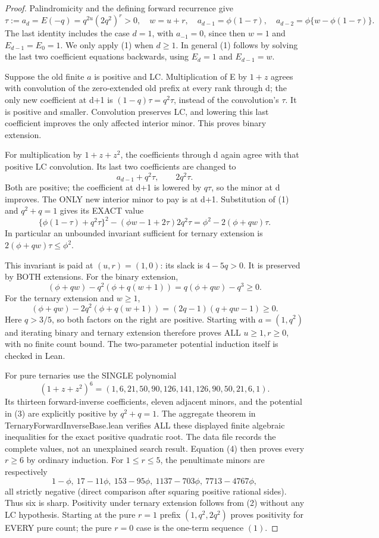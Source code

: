 \begin{proof}
Palindromicity and the defining forward recurrence give
\[
 \tau:=a_d=E(-q)=q^{2u}(2q^2)^r>0,\quad w=u+r,
 \quad a_{d-1}=\phi(1-\tau),\quad
 a_{d-2}=\phi\{w-\phi(1-\tau)\}.                 \tag{1}
\]
The last identity includes the case $d=1$, with $a_{-1}=0$,
since then $w=1$ and $E_{d-1}=E_0=1$. We only apply (1) when
$d\ge1$. In general (1) follows by solving the last two coefficient
equations backwards, using $E_d=1$ and $E_{d-1}=w$.

Suppose the old finite $a$ is positive and LC. Multiplication of E
by $1+z$ agrees with convolution of the zero-extended old prefix
at every rank through d; the only new coefficient at d+1 is
$(1-q)\tau=q^2\tau$, instead of the convolution's $\tau$.
It is positive and smaller. Convolution preserves LC, and lowering
this last coefficient improves the only affected interior minor.
This proves binary extension.

For multiplication by $1+z+z^2$, the coefficients through d again
agree with that positive LC convolution. Its last two coefficients
are changed to
\[
       a_{d-1}+q^2\tau,\qquad 2q^2\tau.           \tag{2}
\]
Both are positive; the coefficient at d+1 is lowered by $q\tau$,
so the minor at d improves. The ONLY new interior minor to pay is
at d+1. Substitution of (1) and $q^2+q=1$ gives its EXACT value
\[
 \{\phi(1-\tau)+q^2\tau\}^2
 -(\phi w-1+2\tau)2q^2\tau
       =\phi^2-2(\phi+qw)\tau.                    \tag{3}
\]
In particular an unbounded invariant sufficient for ternary extension
is $2(\phi+qw)\tau\le\phi^2$.

This invariant is paid at $(u,r)=(1,0)$: its slack is $4-5q>0$.
It is preserved by BOTH extensions. For the binary extension,
\[
 (\phi+qw)-q^2(\phi+q(w+1))=q(\phi+qw)-q^3\ge0.
\]
For the ternary extension and $w\ge1$,
\[
 (\phi+qw)-2q^2(\phi+q(w+1))
             =(2q-1)(q+qw-1)\ge0.                 \tag{4}
\]
Here $q>3/5$, so both factors on the right are positive.
Starting with $a=(1,q^2)$ and iterating binary and ternary extension
therefore proves ALL $u\ge1,r\ge0$, with no finite count bound.
The two-parameter potential induction itself is checked in Lean.

For pure ternaries use the SINGLE polynomial
\[
 (1+z+z^2)^6=(1,6,21,50,90,126,141,126,90,50,21,6,1).
\]
Its thirteen forward-inverse coefficients, eleven adjacent minors,
and the potential in (3) are explicitly positive by $q^2+q=1$.
The aggregate theorem in TernaryForwardInverseBase.lean verifies
ALL these displayed finite algebraic inequalities for the exact
positive quadratic root. The data file records the complete values,
not an unexplained search result. Equation (4) then proves every
$r\ge6$ by ordinary induction. For $1\le r\le5$, the penultimate
minors are respectively
\[
 1-\phi,\ 17-11\phi,\ 153-95\phi,\
 1137-703\phi,\ 7713-4767\phi,
\]
all strictly negative (direct comparison after squaring positive
rational sides). Thus six is sharp. Positivity under ternary
extension follows from (2) without any LC hypothesis. Starting at
the pure $r=1$ prefix $(1,q^2,2q^2)$ proves positivity for EVERY
pure count; the pure $r=0$ case is the one-term sequence $(1)$.
\end{proof}

